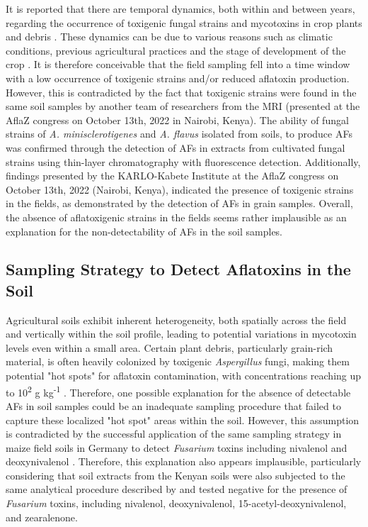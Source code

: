 \begin{refsection}
It is reported that there are temporal dynamics, both within and between years, regarding the occurrence of toxigenic fungal strains and mycotoxins in crop plants and debris \citep{abbas2008dynamics, orum1997spatial, ching2022spatial}. These dynamics can be due to various reasons such as climatic conditions, previous agricultural practices and the stage of development of the crop \citep{ching2022spatial, dutta2001isolation, jaime2010crop}. It is therefore conceivable that the field sampling fell into a time window with a low occurrence of toxigenic strains and/or reduced aflatoxin production. However, this is contradicted by the fact that toxigenic strains were found in the same soil samples by another team of researchers from the MRI (presented at the AflaZ congress on October 13th, 2022 in Nairobi, Kenya). The ability of fungal strains of \textit{A. minisclerotigenes} and \textit{A. flavus} isolated from soils, to produce AFs was confirmed through the detection of AFs in extracts from cultivated fungal strains using thin-layer chromatography with fluorescence detection. Additionally, findings presented by the KARLO-Kabete Institute at the AflaZ congress on October 13th, 2022 (Nairobi, Kenya),  indicated the presence of toxigenic strains in the fields, as demonstrated by the detection of AFs in grain samples. Overall, the absence of aflatoxigenic strains in the fields seems rather implausible as an explanation for the non-detectability of AFs in the soil samples.

\subsection{Sampling Strategy to Detect Aflatoxins in the Soil}

Agricultural soils exhibit inherent heterogeneity, both spatially across the field and vertically within the soil profile, leading to potential variations in mycotoxin levels even within a small area. Certain plant debris, particularly grain-rich material, is often heavily colonized by toxigenic \textit{Aspergillus} fungi, making them potential "hot spots" for aflatoxin contamination, with concentrations reaching up to 10\textsuperscript{2} \textmu g kg\textsuperscript{-1} \citep{accinelli2008aspergillus}. Therefore, one possible explanation for the absence of detectable AFs in soil samples could be an inadequate sampling procedure that failed to capture these localized "hot spot" areas within the soil. However, this assumption is contradicted by the successful application of the same sampling strategy in maize field soils in Germany to detect \textit{Fusarium} toxins including nivalenol and deoxynivalenol \citep{kenngott2022fusarium}. Therefore, this explanation also appears implausible,  particularly considering that soil extracts from the Kenyan soils were also subjected to the same analytical procedure described by \citet{kenngott2022fusarium} and tested negative for the presence of \textit{Fusarium} toxins, including nivalenol, deoxynivalenol, 15-acetyl-deoxynivalenol, and zearalenone.


\end{refsection}
